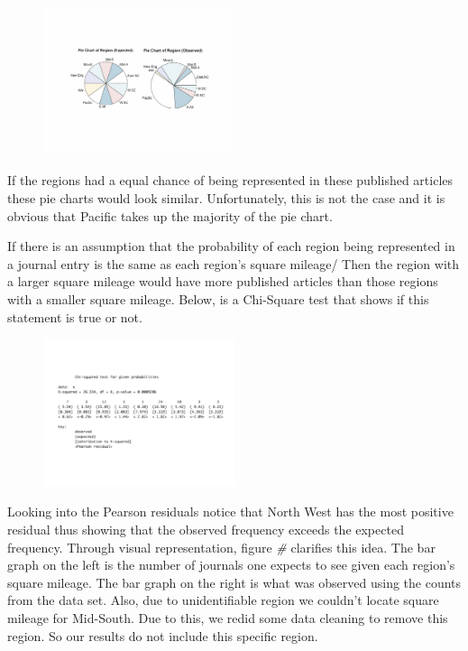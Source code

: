\documentclass[
]{article}
\begin{document}
\begin{figure}
    \centering
    \includegraphics[width=0.50\textwidth]{RegionsPieChart.pdf}
    \label{fig:Region Pie Chart}
\end{figure}

If the regions had a equal chance of being represented in these
published articles these pie charts would look similar. Unfortunately,
this is not the case and it is obvious that Pacific takes up the
majority of the pie chart.

If there is an assumption that the probability of each region being
represented in a journal entry is the same as each region's square
mileage/ Then the region with a larger square mileage would have more
published articles than those regions with a smaller square mileage.
Below, is a Chi-Square test that shows if this statement is true or not.

\begin{figure}
    \centering
    \includegraphics[width=0.50\textwidth]{RegionChiSquare2.pdf}
    \label{fig:Region XChi-Square}
\end{figure}

Looking into the Pearson residuals notice that North West has the most
positive residual thus showing that the observed frequency exceeds the
expected frequency. Through visual representation, figure \emph{\#}
clarifies this idea. The bar graph on the left is the number of journals
one expects to see given each region's square mileage. The bar graph on
the right is what was observed using the counts from the data set. Also,
due to unidentifiable region we couldn't locate square mileage for
Mid-South. Due to this, we redid some data cleaning to remove this
region. So our results do not include this specific region.
\end{document}
